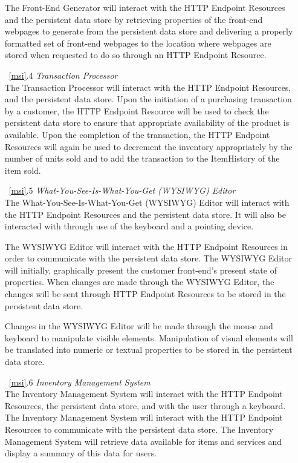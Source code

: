 \documentclass{article}
\newcommand{\br}{\vspace{2mm}}
\begin{document}
\begin{enumerate}
        The Front-End Generator will interact with the HTTP Endpoint Resources
        and the persistent data store by retrieving properties of the front-end
        webpages to generate from the persistent data store and delivering a
        properly formatted set of front-end webpages to the location where
        webpages are stored when requested to do so through an HTTP Endpoint
        Resource.
    \item[~\ref{msi}.4 ] \emph{Transaction Processor}\br\\
        The Transaction Processor will interact with the HTTP Endpoint Resources,
        and the persistent data store.  Upon the initiation of a purchasing
        transaction by a customer, the HTTP Endpoint Resource will be used to
        check the persistent data store to ensure that appropriate availability
        of the product is available.  Upon the completion of the transaction,
        the HTTP Endpoint Resources will again be used to decrement the inventory
        appropriately by the number of units sold and to add the transaction to
        the ItemHistory of the item sold.
    \item[~\ref{msi}.5 ] \emph{What-You-See-Is-What-You-Get (WYSIWYG) Editor}\br\\
        The What-You-See-Is-What-You-Get (WYSIWYG) Editor will interact with the
        HTTP Endpoint Resources and the persistent data store.  It will also
        be interacted with through use of the keyboard and a pointing device.

        The WYSIWYG Editor will interact with the HTTP Endpoint Resources in
        order to communicate with the persistent data store.  The WYSIWYG Editor
        will initially, graphically present the customer front-end's present
        state of properties.  When changes are made through the WYSIWYG Editor,
        the changes will be sent through HTTP Endpoint Resources to be stored
        in the persistent data store.

        Changes in the WYSIWYG Editor will be made through the mouse and keyboard
        to manipulate visible elements.  Manipulation of visual elements will
        be translated into numeric or textual properties to be stored in the
        persistent data store.
    \item[~\ref{msi}.6 ] \emph{Inventory Management System}\br\\
        The Inventory Management System will interact with the HTTP Endpoint
        Resources, the persistent data store, and with the user through a
        keyboard.  The Inventory Management System will interact with the HTTP
        Endpoint Resources to communicate with the persistent data store.  The
        Inventory Management System will retrieve data available for items and
        services and display a summary of this data for users.


\end{enumerate}
\end{document}
